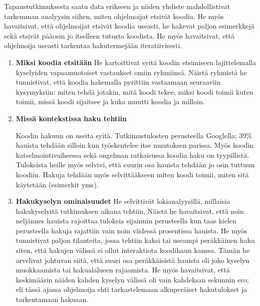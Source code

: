 \documentclass[finnish]{../tktltiki2}
\theoremstyle{definition}
\theoremstyle{remark}
\begin{document}
Tapaustutkimuksesta saatu data erikseen ja niiden yhdiste mahdollistivat tarkemman analyysin siihen, miten ohjelmoijat etsivät koodia. He myös havaitsivat, että ohjelmoijat etsivät koodia useasti, he hakevat paljon esimerkkejä sekä etsivät pääosin jo itselleen tutusta koodista. He myös havaitsivat, että ohjelmoija useasti tarkentaa hakutermejään iteratiivisesti.
\begin{enumerate}
  \item {\bf Miksi koodia etsitään}
    He kartoittivat syitä koodin etsimiseen lajittelemalla kyselyiden vapaamuotoiset vastaukset omiin ryhmiinsä. Näistä ryhmistä he tunnistivat, että koodia hakemalla pyrittiin vastaamaan seuraaviin kysymyksiin: miten tehdä jotakin, mitä koodi tekee, miksi koodi toimii kuten toimii, missä koodi sijaitsee ja kuka muutti koodia ja milloin.

  \item {\bf Missä kontekstissa haku tehtiin}

    Koodin hakuun on useita syitä. Tutkimustulosten perusteella Googlella; 39\% hauista tehdään silloin kun työskentelee itse muutoksen parissa. Myös koodin katselmointivaiheessa sekä ongelman ratkaisussa koodia haku on tyypillistä.  Tuloksista heille myös selvivi, että suurin osa hauista tehdään jo osin tuttuun koodiin. Hakuja tehdään myös selvittääkseen miten koodi toimii, miten sitä käytetään (esimerkit yms).

  \item {\bf Hakukyselyn ominaisuudet}
    He selvittivät lokianalyysillä, millaisia hakukyselyitä tutkimuksen aikana tehtiin. Näistä he havaitsivat, että noin neljännes hauista rajoittaa tuloksia sijainnin perusteella kun taas kielen perusteella hakuja rajattiin vain noin viidessä prosentissa hauista.
    He myös tunnistivat paljon tilanteita, jossa tehtiin kaksi tai useampi peräkkäinen haku siten, että hakujen välissä ei ollut interaktiota koodihaun kanssa. Tämän he arvelivat johtuvan siitä, että suuri osa peräkkäisistä hauista oli joko kyselyn muokkaamista tai hakualalueen rajaamista. He myös havaitsivat, että keskimäärin näiden kahden kyselyn välissä oli vain kahdeksan sekunnin ero; eli tässä ajassa ohjelmoija ehti tarkastelemaan alkuperäiset hakutulokset ja tarkentamaan hakuaan.


\end{enumerate}
\end{document}
